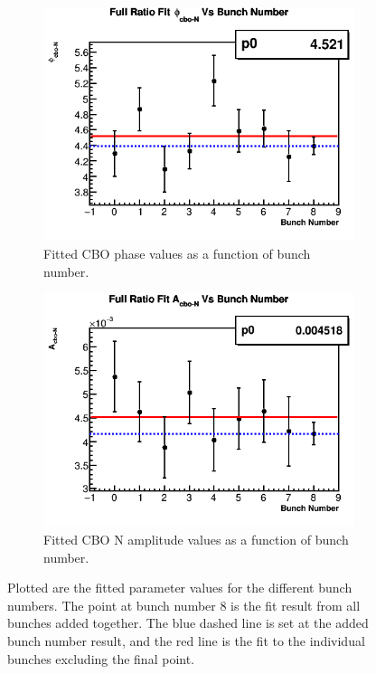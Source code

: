 \begin{figure}[]
			\vspace{4mm}
		    \begin{subfigure}[t]{0.4\textwidth}
			    \centering
				\includegraphics[width=\textwidth]{RatioCBO_phi_cbo-N_Vs_BunchNum_Canv}
			    \caption{Fitted CBO phase values as a function of bunch number.}
		    \end{subfigure}
		    \hspace{4mm}
		    \begin{subfigure}[t]{0.4\textwidth}
			    \centering
				\includegraphics[width=\textwidth]{RatioCBO_A_cbo-N_Vs_BunchNum_Canv}
			    \caption{Fitted CBO N amplitude values as a function of bunch number.}
		    \end{subfigure}%
			\vspace{4mm}
		\caption[BunchNumPars]{Plotted are the fitted parameter values for the different bunch numbers. The point at bunch number 8 is the fit result from all bunches added together. The blue dashed line is set at the added bunch number result, and the red line is the fit to the individual bunches excluding the final point.}
		\label{fig:BunchNumPars}
		\end{figure}

